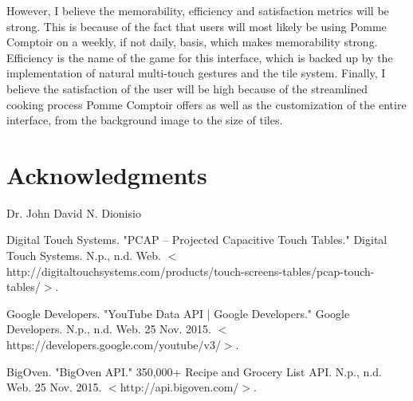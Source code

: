 \documentclass[fleqn,10pt]{wlpeerj}
\begin{document}
However, I believe the memorability, efficiency and satisfaction metrics will be strong. This is because of the fact that users will most likely be using Pomme Comptoir on a weekly, if not daily, basis, which makes memorability strong. Efficiency is the name of the game for this interface, which is backed up by the implementation of natural multi-touch gestures and the tile system. Finally, I believe the satisfaction of the user will be high because of the streamlined cooking process Pomme Comptoir offers as well as the customization of the entire interface, from the background image to the size of tiles. 

\section*{Acknowledgments}

Dr. John David N. Dionisio

\begin{thebibliography}{5}

	Digital Touch Systems. "PCAP – Projected Capacitive Touch Tables." Digital Touch Systems. N.p., n.d. Web. $<$http://digitaltouchsystems.com/products/touch-screens-tables/pcap-touch-tables/$>$.

	Google Developers. "YouTube Data API  |  Google Developers." Google Developers. N.p., n.d. Web. 25 Nov. 2015. $<$https://developers.google.com/youtube/v3/$>$.
    
    BigOven. "BigOven API." 350,000+ Recipe and Grocery List API. N.p., n.d. Web. 25 Nov. 2015. $<$http://api.bigoven.com/$>$. 


\end{thebibliography}
\end{document}
